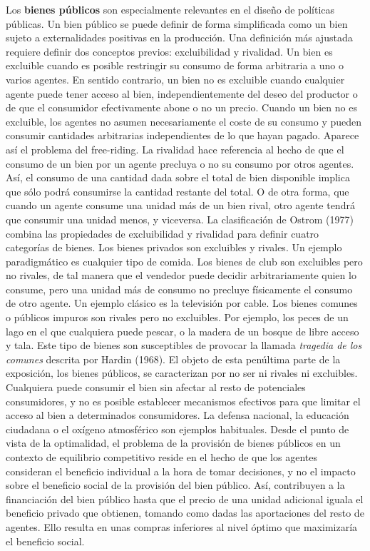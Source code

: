 \documentclass{nuevotema}
\begin{document}
Los \textbf{bienes públicos} son especialmente relevantes en el diseño de políticas públicas. Un bien público se puede definir de forma simplificada como un bien sujeto a externalidades positivas en la producción. Una definición más ajustada requiere definir dos conceptos previos: excluibilidad y rivalidad. Un bien es excluible cuando es posible restringir su consumo de forma arbitraria a uno o varios agentes. En sentido contrario, un bien no es excluible cuando cualquier agente puede tener acceso al bien, independientemente del deseo del productor o de que el consumidor efectivamente abone o no un precio. Cuando un bien no es excluible, los agentes no asumen necesariamente el coste de su consumo y pueden consumir cantidades arbitrarias independientes de lo que hayan pagado. Aparece así el problema del free-riding. La rivalidad hace referencia al hecho de que el consumo de un bien por un agente precluya o no su consumo por otros agentes. Así, el consumo de una cantidad dada sobre el total de bien disponible implica que sólo podrá consumirse la cantidad restante del total. O de otra forma, que cuando un agente consume una unidad más de un bien rival, otro agente tendrá que consumir una unidad menos, y viceversa. La clasificación de Ostrom (1977) combina las propiedades de excluibilidad y rivalidad para definir cuatro categorías de bienes. Los bienes privados son excluibles y rivales. Un ejemplo paradigmático es cualquier tipo de comida. Los bienes de club son excluibles pero no rivales, de tal manera que el vendedor puede decidir arbitrariamente quien lo consume, pero una unidad más de consumo no precluye físicamente el consumo de otro agente. Un ejemplo clásico es la televisión por cable. Los bienes comunes o públicos impuros son rivales pero no excluibles. Por ejemplo, los peces de un lago en el que cualquiera puede pescar, o la madera de un bosque de libre acceso y tala. Este tipo de bienes son susceptibles de provocar la llamada \textit{tragedia de los comunes} descrita por Hardin (1968). El objeto de esta penúltima parte de la exposición, los bienes públicos, se caracterizan por no ser ni rivales ni excluibles. Cualquiera puede consumir el bien sin afectar al resto de potenciales consumidores, y no es posible establecer mecanismos efectivos para que limitar el acceso al bien a determinados consumidores. La defensa nacional, la educación ciudadana o el oxígeno atmosférico son ejemplos habituales. Desde el punto de vista de la optimalidad, el problema de la provisión de bienes públicos en un contexto de equilibrio competitivo reside en el hecho de que los agentes consideran el beneficio individual a la hora de tomar decisiones, y no el impacto sobre el beneficio social de la provisión del bien público. Así, contribuyen a la financiación del bien público hasta que el precio de una unidad adicional iguala el beneficio privado que obtienen, tomando como dadas las aportaciones del resto de agentes. Ello resulta en unas compras inferiores al nivel óptimo que maximizaría el beneficio social.
\end{document}
